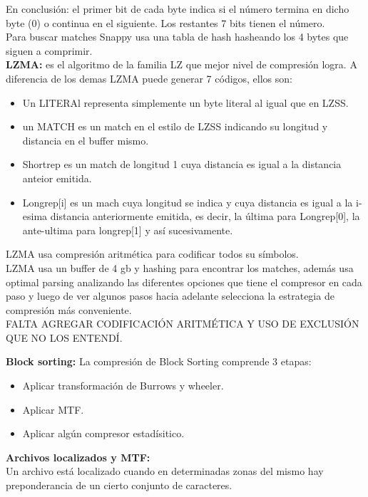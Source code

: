 \documentclass[titlepage,a4paper]{article}
\begin{document}
En conclusión: el primer bit de cada byte indica si el número termina en dicho byte (0) o continua en el siguiente. Los restantes 7 bits tienen el número. \\

Para buscar matches Snappy usa una tabla de hash hasheando los 4 bytes que siguen a comprimir. \\

\textbf{LZMA:} es el algoritmo de la familia LZ que mejor nivel de compresión logra. A diferencia de los demas LZMA puede generar 7 códigos, ellos son:
\begin{itemize}
\item Un LITERAl representa simplemente un byte literal al igual que en LZSS. 
\item un MATCH es un match en el estilo de LZSS indicando su longitud y distancia en el buffer mismo. 
\item Shortrep es un match de longitud 1 cuya distancia es igual a la distancia anteior emitida. 
\item Longrep[i] es un mach cuya longitud se indica y cuya distancia es igual a la i-esima distancia anteriormente emitida, es decir, la última para Longrep[0], la ante-ultima para longrep[1] y así sucesivamente. 
\end{itemize}
LZMA usa compresión aritmética para codificar todos su símbolos. \\

LZMA usa un buffer de 4 gb y hashing para encontrar los matches, además usa optimal parsing analizando las diferentes opciones que tiene el compresor en cada paso y luego de ver algunos pasos hacia adelante selecciona la estrategia de compresión más conveniente. \\

FALTA AGREGAR CODIFICACIÓN ARITMÉTICA Y USO DE EXCLUSIÓN QUE NO LOS ENTENDÍ. 

\textbf{Block sorting:} La compresión de Block Sorting comprende 3 etapas:
\begin{itemize}
\item Aplicar transformación de Burrows y wheeler. 
\item Aplicar MTF.
\item Aplicar algún compresor estadísitico. 
\end{itemize}

\textbf{Archivos localizados y  MTF:}\\

Un archivo está localizado cuando en determinadas zonas del mismo hay preponderancia de un cierto conjunto de caracteres. \\
\end{document}
